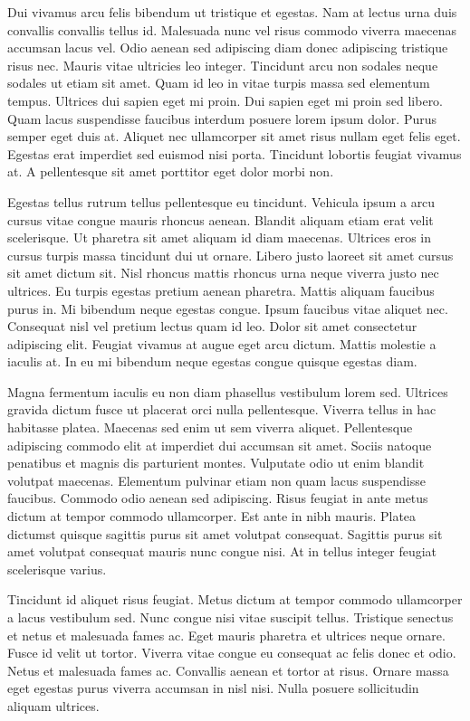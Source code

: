 \documentclass[11pt,a4paper]{article}
\begin{document}
Dui vivamus arcu felis bibendum ut tristique et egestas. Nam at lectus urna duis convallis convallis tellus id. Malesuada nunc vel risus commodo viverra maecenas accumsan lacus vel. Odio aenean sed adipiscing diam donec adipiscing tristique risus nec. Mauris vitae ultricies leo integer. Tincidunt arcu non sodales neque sodales ut etiam sit amet. Quam id leo in vitae turpis massa sed elementum tempus. Ultrices dui sapien eget mi proin. Dui sapien eget mi proin sed libero. Quam lacus suspendisse faucibus interdum posuere lorem ipsum dolor. Purus semper eget duis at. Aliquet nec ullamcorper sit amet risus nullam eget felis eget. Egestas erat imperdiet sed euismod nisi porta. Tincidunt lobortis feugiat vivamus at. A pellentesque sit amet porttitor eget dolor morbi non.

Egestas tellus rutrum tellus pellentesque eu tincidunt. Vehicula ipsum a arcu cursus vitae congue mauris rhoncus aenean. Blandit aliquam etiam erat velit scelerisque. Ut pharetra sit amet aliquam id diam maecenas. Ultrices eros in cursus turpis massa tincidunt dui ut ornare. Libero justo laoreet sit amet cursus sit amet dictum sit. Nisl rhoncus mattis rhoncus urna neque viverra justo nec ultrices. Eu turpis egestas pretium aenean pharetra. Mattis aliquam faucibus purus in. Mi bibendum neque egestas congue. Ipsum faucibus vitae aliquet nec. Consequat nisl vel pretium lectus quam id leo. Dolor sit amet consectetur adipiscing elit. Feugiat vivamus at augue eget arcu dictum. Mattis molestie a iaculis at. In eu mi bibendum neque egestas congue quisque egestas diam.

Magna fermentum iaculis eu non diam phasellus vestibulum lorem sed. Ultrices gravida dictum fusce ut placerat orci nulla pellentesque. Viverra tellus in hac habitasse platea. Maecenas sed enim ut sem viverra aliquet. Pellentesque adipiscing commodo elit at imperdiet dui accumsan sit amet. Sociis natoque penatibus et magnis dis parturient montes. Vulputate odio ut enim blandit volutpat maecenas. Elementum pulvinar etiam non quam lacus suspendisse faucibus. Commodo odio aenean sed adipiscing. Risus feugiat in ante metus dictum at tempor commodo ullamcorper. Est ante in nibh mauris. Platea dictumst quisque sagittis purus sit amet volutpat consequat. Sagittis purus sit amet volutpat consequat mauris nunc congue nisi. At in tellus integer feugiat scelerisque varius.

Tincidunt id aliquet risus feugiat. Metus dictum at tempor commodo ullamcorper a lacus vestibulum sed. Nunc congue nisi vitae suscipit tellus. Tristique senectus et netus et malesuada fames ac. Eget mauris pharetra et ultrices neque ornare. Fusce id velit ut tortor. Viverra vitae congue eu consequat ac felis donec et odio. Netus et malesuada fames ac. Convallis aenean et tortor at risus. Ornare massa eget egestas purus viverra accumsan in nisl nisi. Nulla posuere sollicitudin aliquam ultrices.
\end{document}
